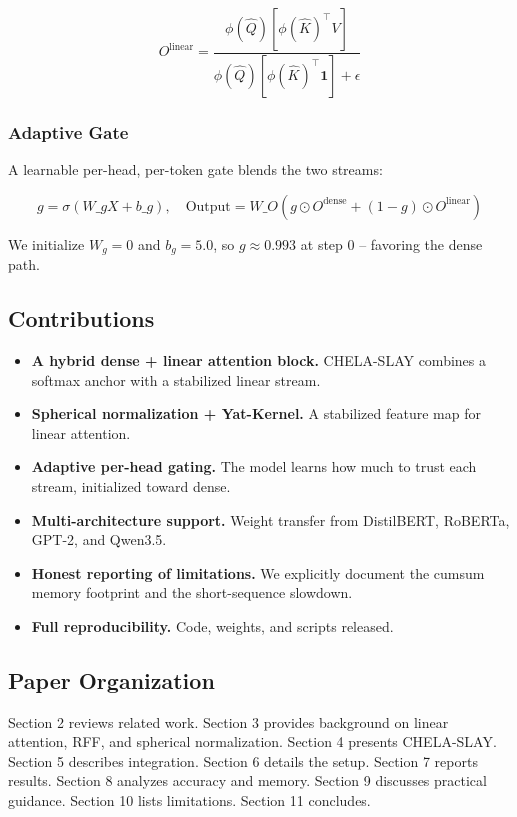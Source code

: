\[
O^\text{linear} = \frac{\phi(\hat{Q}) \left[ \phi(\hat{K})^\top V \right]}{\phi(\hat{Q}) \left[ \phi(\hat{K})^\top \mathbf{1} \right] + \epsilon}
\]

\subsubsection{Adaptive Gate}

A learnable per-head, per-token gate blends the two streams:

\[
g = \sigma(W\_g X + b\_g), \quad
\text{Output} = W\_O \left( g \odot O^\text{dense} + (1 - g) \odot O^\text{linear} \right)
\]

We initialize $W_g = 0$ and $b_g = 5.0$, so 
$g \approx 0.993$ at step 0 -- favoring the dense path.

\subsection{Contributions}

\begin{itemize}
\item \textbf{A hybrid dense + linear attention block.} CHELA-SLAY combines a
  softmax anchor with a stabilized linear stream.
\item \textbf{Spherical normalization + Yat-Kernel.} A stabilized feature map for
  linear attention.
\item \textbf{Adaptive per-head gating.} The model learns how much to trust each
  stream, initialized toward dense.
\item \textbf{Multi-architecture support.} Weight transfer from DistilBERT, RoBERTa,
  GPT-2, and Qwen3.5.
\item \textbf{Honest reporting of limitations.} We explicitly document the cumsum
  memory footprint and the short-sequence slowdown.
\item \textbf{Full reproducibility.} Code, weights, and scripts released.

\end{itemize}
\subsection{Paper Organization}

Section 2 reviews related work. Section 3 provides background on linear 
attention, RFF, and spherical normalization. Section 4 presents CHELA-SLAY. 
Section 5 describes integration. Section 6 details the setup. Section 7 
reports results. Section 8 analyzes accuracy and memory. Section 9 
discusses practical guidance. Section 10 lists limitations. Section 11 
concludes.



